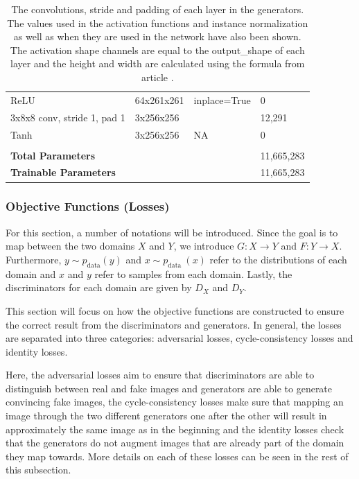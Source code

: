 \documentclass[12pt, fleqn, titlepage]{article}
\begin{document}
\begin{table}[H]
\begin{tabular}{llll}
		ReLU                                        & 64x261x261     & inplace=True& 0             \\
		3x8x8 conv, stride 1, pad 1                 & 3x256x256      &             & 12,291        \\
		Tanh                                        & 3x256x256      & NA          & 0             \\
		                                            &                &             &               \\
		\textbf{Total Parameters}                   &                &             & 11,665,283    \\
		\textbf{Trainable Parameters}               &                &             & 11,665,283    \\ \bottomrule
	\end{tabular}
	\caption{The convolutions, stride and padding of each layer in the generators. The values used in the activation functions and instance normalization as well as when they are used in the network have also been shown. The activation shape channels are equal to the output\_shape of each layer and the height and width are calculated using the formula from article \protect\cite{calculate_activation_shape}.}
	\label{tab:generator_layers}
\end{table}

\subsubsection{Objective Functions (Losses)}
For this section, a number of notations will be introduced. Since the goal is to map between the two domains $X$ and $Y$, we introduce $G : X \rightarrow Y$ and $F : Y \rightarrow X$. Furthermore, $y \sim p_{\text {data}}(y)$ and $x \sim p_{\text {data }}(x)$ refer to the distributions of each domain and $x$ and $y$ refer to samples from each domain. Lastly, the discriminators for each domain are given by $D_X$ and $D_Y$.

This section will focus on how the objective functions are constructed to ensure the correct result from the discriminators and generators. In general, the losses are separated into three categories: adversarial losses, cycle-consistency losses and identity losses. 

Here, the adversarial losses aim to ensure that discriminators are able to distinguish between real and fake images and generators are able to generate convincing fake images, the cycle-consistency losses make sure that mapping an image through the two different generators one after the other will result in approximately the same image as in the beginning and the identity losses check that the generators do not augment images that are already part of the domain they map towards. More details on each of these losses can be seen in the rest of this subsection.
\end{document}
